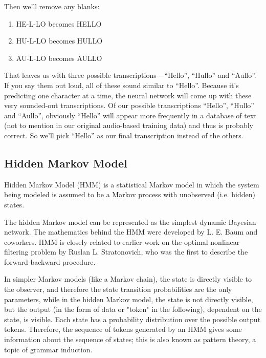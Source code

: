 \documentclass[12pt,a4paper]{article}
\begin{document}
\begin{enumerate}
   
\par 
Then we’ll remove any blanks:
\begin{enumerate}
\item HE-L-LO becomes HELLO
\item HU-L-LO becomes HULLO
\item AU-L-LO becomes AULLO
\end{enumerate}

\par
That leaves us with three possible transcriptions — “Hello”, “Hullo” and “Aullo”. If you say them out loud, all of these sound similar to “Hello”. Because it’s predicting one character at a time, the neural network will come up with these very sounded-out transcriptions.
Of our possible transcriptions “Hello”, “Hullo” and “Aullo”, obviously “Hello” will appear more frequently in a database of text (not to mention in our original audio-based training data) and thus is probably correct. So we’ll pick “Hello” as our final transcription instead of the others. 

\end{enumerate}

\newpage

\begin{center}
\section{Hidden Markov Model}
\end{center}
Hidden Markov Model (HMM) is a statistical Markov model in which the system being modeled is assumed to be a Markov process with unobserved (i.e. hidden) states.

The hidden Markov model can be represented as the simplest dynamic Bayesian network. The mathematics behind the HMM were developed by L. E. Baum and coworkers.
HMM is closely related to earlier work on the optimal nonlinear filtering problem by Ruslan L. Stratonovich, who was the first to describe the forward-backward procedure.

In simpler Markov models (like a Markov chain), the state is directly visible to the observer, and therefore the state transition probabilities are the only parameters, while in the hidden Markov model, the state is not directly visible, but the output (in the form of data or "token" in the following), dependent on the state, is visible. Each state has a probability distribution over the possible output tokens. Therefore, the sequence of tokens generated by an HMM gives some information about the sequence of states; this is also known as pattern theory, a topic of grammar induction.
\end{document}
